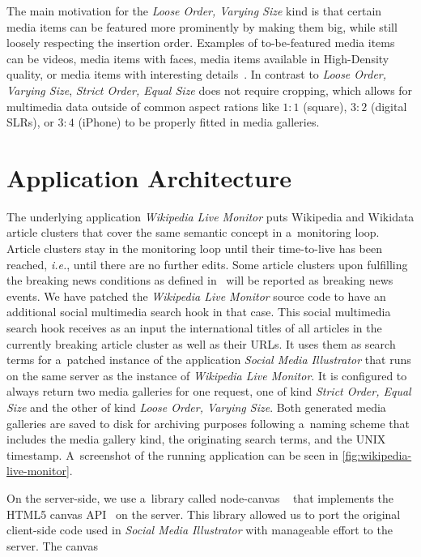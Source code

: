 \documentclass{sig-alternate-somus}
\begin{document}
The main motivation for the \emph{Loose Order, Varying Size} kind
is that certain media items can be featured more prominently
by making them big, while still loosely respecting the insertion order.
Examples of to-be-featured media items can be videos,
media items with faces, media items available in High-Density quality,
or media items with interesting details~\cite{suh2003thumbnail}.
In contrast to \emph{Loose Order, Varying Size},
\emph{Strict Order, Equal Size} does not require cropping,
which allows for multimedia data outside of common aspect rations like
$1{:}1$ (square), $3{:}2$ (digital SLRs), or $3{:}4$ (iPhone)
to be properly fitted in media galleries.

\section{Application Architecture}
\label{sec:application-architecture}
\selectfont

The underlying application \emph{Wikipedia Live Monitor}
puts Wiki\-pedia and Wikidata article clusters
that cover the same semantic concept
in a~monitoring loop.
Article clusters stay in the monitoring loop until
their time-to-live has been reached,
\emph{i.e.}, until there are no further edits.
Some article clusters upon fulfilling the breaking news conditions
as defined in~\cite{steiner2013mjnomore}
will be reported as breaking news events.
We have patched the \emph{Wikipedia Live Monitor} source code
to have an additional social multimedia search hook in that case.
This social multimedia search hook receives as an input
the international titles of all articles
in the currently breaking article cluster as well as their URLs.
It uses them as search terms for a~patched instance
of the application \emph{Social Media Illustrator}
that runs on the same server
as the instance of \emph{Wikipedia Live Monitor}.
It is configured to always return two media galleries
for one request, one of kind \emph{Strict Order, Equal Size}
and the other of kind \emph{Loose Order, Varying Size}.
Both generated media galleries are saved to disk
for archiving purposes following a~naming scheme
that includes the media gallery kind,
the originating search terms, and the UNIX timestamp.
A~screenshot of the running application can be seen in
\autoref{fig:wikipedia-live-monitor}.

On the server-side, we use a~library called node-canvas%
~\cite{holowaychuk2013nodecanvas} that implements the
HTML5 canvas API~\cite{cabanier2013canvas} on the server.
This library allowed us to port the original client-side code 
used in \emph{Social Media Illustrator}
with manageable effort to the server. The canvas\linebreak
\end{document}
